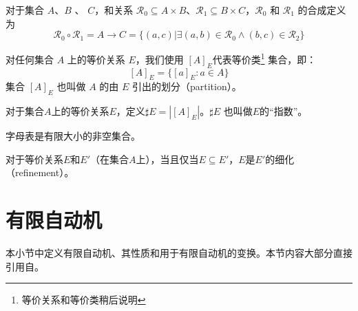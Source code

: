 \begin{definition}
    对于集合 $A$、$B$ 、 $C$，和关系 $\mathcal{R}_0 \subseteq A \times B$、$\mathcal{R}_1 \subseteq B \times C$，$\mathcal{R}_0$ 和 $\mathcal{R}_1$ 的合成定义为
    \[ 
        \mathcal{R}_0 \circ \mathcal{R}_1 = A \to C = \{ (a,c) | \exists (a,b) \in \mathcal{R}_0 \land (b,c) \in \mathcal{R}_2 \}
    \]
\end{definition}

\begin{definition}\label{def:equiv-class}
    对任何集合 $A$ 上的等价关系 $E$，我们使用 $[A]_E$代表等价类\footnote{等价关系和等价类稍后说明} 集合，即：
$$ [A]_E = \{ [a]_E :a \in A \} $$
集合 $[A]_E$ 也叫做 $A$ 的由 $E$ 引出的划分（partition）。
\end{definition}

\begin{definition}
    对于集合$A$上的等价关系$E$，定义$\sharp E = | [A]_E |$。$\sharp E$ 也叫做$E$的“指数”。
\end{definition}


\begin{definition} \label{def:Alphabat}
    字母表是有限大小的非空集合。
\end{definition}

\begin{definition}[等价关系的细化]
    对于等价关系$E$和$E'$（在集合$A$上），当且仅当$E \subseteq E'$，$E$是$E'$的细化（refinement）。
\end{definition}













\section{有限自动机}

本小节中定义有限自动机、其性质和用于有限自动机的变换。本节内容大部分直接引用自\cite{watson1993taxonomyb}。


